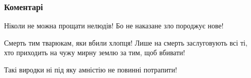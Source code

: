  
 
 
 
 
\subsubsection{Коментарі}

\begin{itemize}
 
Ніколи не можна прощати нелюдів! Бо не наказане зло породжує нове!

 
Смерть тим тварюкам, яки вбили хлопця! Лише на смерть заслуговують всі ті, хто приходить на чужу мирну землю за тим, щоб вбивати!

 
Такі виродки ні під яку амністію не повинні потрапити!

 
🖤

 

\end{itemize}
